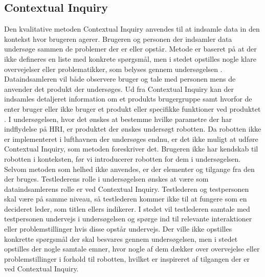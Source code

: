 \subsection{Contextual Inquiry}
\label{ParametreContextualInquiry}
%
Den kvalitative metoden Contextual Inquiry anvendes til at indsamle data in den kontekst hvor brugeren agerer. Brugeren og personen der indsamler data undersøge sammen de problemer der er eller opstår. Metode er baseret på at der ikke defineres en liste med konkrete spørgsmål, men i stedet opstilles nogle klare overvejelser eller problematikker, som belyses gennem undersøgelsen \textcite[s. 1]{PDF:UsingCIToLearn}.  Dataindsamleren vil både observere bruger og tale med personen mens de anvender det produkt der undersøges. \blankline
%
Ud fra Contextual Inquiry kan der indsamles detaljeret information om et produkts brugergruppe samt hvorfor de enter bruger eller ikke bruger et produkt eller specifikke funktioner ved produktet \textcite[s. 2]{PDF:UsingCIToLearn}. \blankline
%
I undersøgelsen, hvor det ønskes at bestemme hvilke parametre der har indflydelse på HRI, er produktet der ønskes undersøgt robotten. Da robotten ikke er implementeret i lufthavnen der undersøges endnu, er det ikke muligt at udføre Contextual Inquiry, som metoden foreskriver det. Brugeren ikke har kendskab til robotten i konteksten, før vi introducerer robotten for dem i undersøgelsen. Selvom metoden som helhed ikke anvendes, er der elementer og tilgange fra den der bruges. \blankline
%
Testlederens rolle i undersøgelsen ønskes at være som dataindsamlerens rolle er ved Contextual Inquiry. Testlederen og testpersonen skal være på samme niveau, så testlederen kommer ikke til at fungere som en decideret leder, som titlen ellers indikerer. I stedet vil testlederen samtale med testpersonen undervejs i undersøgelsen og spørge ind til relevante interaktioner eller problemstillinger hvis disse opstår undervejs. Der ville ikke opstilles konkrette spørgsmål der skal besvares gennem undersøgelsen, men i stedet opstilles der nogle samtale emner, hvor nogle af dem dækker over overvejelse eller problemstillinger i forhold til robotten, hvilket er inspireret af tilgangen der er ved Contextual Inquiry. \blankline
%
